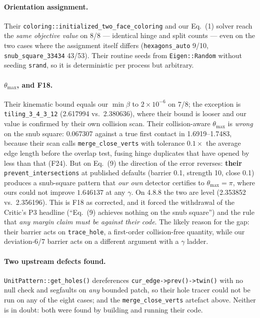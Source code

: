 \documentclass[10pt,a4paper]{article}
\newcommand{\fn}[1]{\nolinkurl{#1}}
\begin{document}
\paragraph{Orientation assignment.} Their \fn{coloring::initialized_two_face_coloring} and our
Eq.~(1) solver reach the \emph{same objective value} on 8/8 --- identical hinge and split counts
--- even on the two cases where the assignment itself differs (\fn{hexagons_auto} 9/10,
\fn{snub_square_33434} 43/53). Their routine seeds from \texttt{Eigen::Random} without seeding
\texttt{srand}, so it is deterministic per process but arbitrary.

\paragraph{$\theta_{\max}$, and F18.} Their kinematic bound equals our $\min\beta$ to
$2\times10^{-6}$ on 7/8; the exception is \fn{tiling_3_4_3_12} (2.617994 vs.\ 2.380636), where
their bound is looser and our value is confirmed by their own collision scan. Their
collision-aware $\theta_{\max}$ is \emph{wrong} on the snub square: 0.067307 against a true
first contact in 1.6919--1.7483, because their scan calls \texttt{merge\_close\_verts} with
tolerance $0.1\times$ the average edge length before the overlap test, fusing hinge duplicates
that have opened by less than that (F24). But on Eq.~(9) the direction of the error reverses:
\textbf{their} \texttt{prevent\_intersections} at published defaults (barrier 0.1, strength 10,
close 0.1) produces a snub-square pattern that \emph{our own} detector certifies to
$\theta_{\max} = \pi$, where ours could not improve $1.646137$ at any $\gamma$. On 4.8.8 the two
are level (2.353852 vs.\ 2.356196). This is F18 as corrected, and it forced the withdrawal of
the Critic's P3 headline (``Eq.~(9) achieves nothing on the snub square'') and the rule that
\emph{any margin claim must be against their code}. The likely reason for the gap: their barrier
acts on \fn{trace_hole}, a first-order collision-free quantity, while our deviation-6/7 barrier
acts on a different argument with a $\gamma$ ladder.

\paragraph{Two upstream defects found.} \fn{UnitPattern::get_holes()} dereferences
\fn{cur_edge->prev()->twin()} with no null check and segfaults on \emph{any} bounded patch, so
their hole tracer could not be run on any of the eight cases; and the
\texttt{merge\_close\_verts} artefact above. Neither is in doubt: both were found by building
and running their code.
\end{document}
